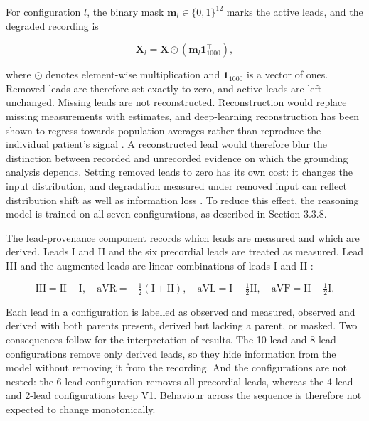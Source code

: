 For configuration $l$, the binary mask $\mathbf{m}_l \in \{0,1\}^{12}$ marks the active leads, and the degraded recording is

\[
\mathbf{X}_l = \mathbf{X} \odot \left(\mathbf{m}_l \mathbf{1}_{1000}^{\top}\right),
\]

where $\odot$ denotes element-wise multiplication and $\mathbf{1}_{1000}$ is a vector of ones. Removed leads are therefore set exactly to zero, and active leads are left unchanged. Missing leads are not reconstructed. Reconstruction would replace missing measurements with estimates, and deep-learning reconstruction has been shown to regress towards population averages rather than reproduce the individual patient's signal \cite{PRESACAN2025RECON}. A reconstructed lead would therefore blur the distinction between recorded and unrecorded evidence on which the grounding analysis depends. Setting removed leads to zero has its own cost: it changes the input distribution, and degradation measured under removed input can reflect distribution shift as well as information loss \cite{HOOKER2019ROAR}. To reduce this effect, the reasoning model is trained on all seven configurations, as described in Section 3.3.8.

The lead-provenance component records which leads are measured and which are derived. Leads I and II and the six precordial leads are treated as measured. Lead III and the augmented leads are linear combinations of leads I and II \cite{KLIGFIELD2007AHA}:

\[
\text{III} = \text{II} - \text{I}, \quad \text{aVR} = -\tfrac{1}{2}(\text{I} + \text{II}), \quad \text{aVL} = \text{I} - \tfrac{1}{2}\text{II}, \quad \text{aVF} = \text{II} - \tfrac{1}{2}\text{I}.
\]

Each lead in a configuration is labelled as observed and measured, observed and derived with both parents present, derived but lacking a parent, or masked. Two consequences follow for the interpretation of results. The 10-lead and 8-lead configurations remove only derived leads, so they hide information from the model without removing it from the recording. And the configurations are not nested: the 6-lead configuration removes all precordial leads, whereas the 4-lead and 2-lead configurations keep V1. Behaviour across the sequence is therefore not expected to change monotonically.

